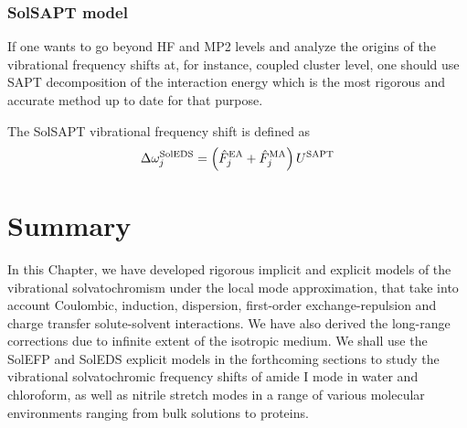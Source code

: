 \documentclass[a4paper,titlepage,twoside,fleqn,12pt]{book}
\begin{document}
\begin{refsection}
\subsubsection{SolSAPT model}

If one wants to go beyond HF and MP2 levels and
analyze the origins of the vibrational frequency 
shifts at, for instance, coupled cluster
level, one should use SAPT decomposition of the interaction
energy which is
the most rigorous and accurate method up to date for that purpose.

The SolSAPT vibrational frequency shift is defined as
%
\begin{equation}
 \Delta\omega_j^{\rm SolEDS} = \left(\hat{F}_j^{\rm EA} + \hat{F}_j^{\rm MA}\right) U^{\rm SAPT} 
\end{equation}
%

\section{Summary}

In this Chapter, we have developed rigorous implicit and
explicit models of the vibrational solvatochromism under
the local mode approximation, that take into account
Coulombic, induction, dispersion, first\hyp{}order 
exchange\hyp{}repulsion and charge transfer solute\hyp{}solvent
interactions. We have also derived the long\hyp{}range
corrections due to infinite extent of the isotropic medium. 
We shall use the SolEFP and SolEDS explicit models
in the forthcoming sections to study the vibrational solvatochromic
frequency shifts of amide I mode in water and chloroform, 
as well as nitrile stretch modes in a range of various molecular
environments ranging from bulk solutions to proteins.


%


\printbibliography[heading=subbibintoc,title={References}]
\end{refsection}





\end{document}
